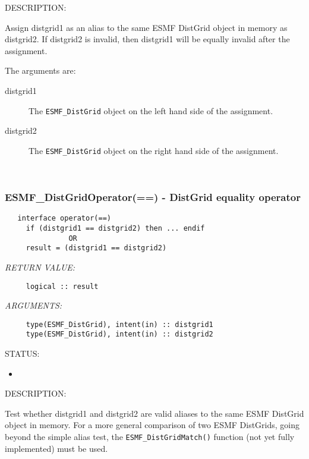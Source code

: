 {\sf DESCRIPTION:\\ }


     Assign distgrid1 as an alias to the same ESMF DistGrid object in memory
     as distgrid2. If distgrid2 is invalid, then distgrid1 will be equally
     invalid after the assignment.
  
     The arguments are:
     \begin{description}
     \item[distgrid1]
       The {\tt ESMF\_DistGrid} object on the left hand side of the assignment.
     \item[distgrid2]
       The {\tt ESMF\_DistGrid} object on the right hand side of the assignment.
     \end{description}
   
 
\mbox{}\hrulefill\ 
 
\subsubsection [ESMF\_DistGridOperator(==)] {ESMF\_DistGridOperator(==) - DistGrid equality operator}


  
\begin{verbatim}   interface operator(==)
     if (distgrid1 == distgrid2) then ... endif
               OR
     result = (distgrid1 == distgrid2)\end{verbatim}{\em RETURN VALUE:}
\begin{verbatim}     logical :: result\end{verbatim}{\em ARGUMENTS:}
\begin{verbatim}     type(ESMF_DistGrid), intent(in) :: distgrid1
     type(ESMF_DistGrid), intent(in) :: distgrid2\end{verbatim}
{\sf STATUS:}
   \begin{itemize}
   \item{}
   \end{itemize}
  
{\sf DESCRIPTION:\\ }


     Test whether distgrid1 and distgrid2 are valid aliases to the same ESMF
     DistGrid object in memory. For a more general comparison of two 
     ESMF DistGrids, going beyond the simple alias test, the 
     {\tt ESMF\_DistGridMatch()} function (not yet fully implemented) must 
     be used.
  
